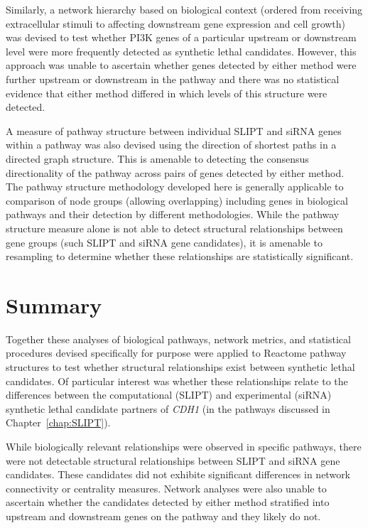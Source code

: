 Similarly, a network hierarchy based on biological context (ordered from receiving extracellular stimuli to affecting downstream gene expression and cell growth) was devised to test whether PI3K genes of a particular upstream or downstream level were more frequently detected as synthetic lethal candidates. However, this approach was unable to ascertain whether genes detected by either method were further upstream or downstream in the pathway and there was no statistical evidence that either method differed in which levels of this structure were detected.

A measure of pathway structure between individual \gls{SLIPT} and \gls{siRNA} genes within a pathway was also devised using the direction of shortest paths in a directed graph structure. This is amenable to detecting the consensus directionality of the pathway across pairs of genes detected by either method. The pathway structure methodology developed here is generally applicable to comparison of node groups (allowing overlapping) including genes in biological pathways and their detection by different methodologies. While the pathway structure measure alone is not able to detect structural relationships between gene groups (such \gls{SLIPT} and \gls{siRNA} gene candidates), it is amenable to resampling to determine whether these relationships are statistically significant.

\section{Summary}

Together these analyses of biological pathways, network metrics, and statistical procedures devised specifically for purpose were applied to Reactome pathway structures to test whether structural relationships exist between synthetic lethal candidates. Of particular interest was whether these relationships relate to the differences between the computational (\gls{SLIPT}) and experimental (\gls{siRNA}) synthetic lethal candidate partners of \textit{CDH1} (in the pathways discussed in Chapter~\ref{chap:SLIPT}).

While biologically relevant relationships were observed in specific pathways, there were not detectable structural relationships between \gls{SLIPT} and \gls{siRNA} gene candidates. These candidates did not exhibite significant differences in network connectivity or centrality measures. Network analyses were also unable to ascertain whether the candidates detected by either method stratified into upstream and downstream genes on the pathway and they likely do not.

